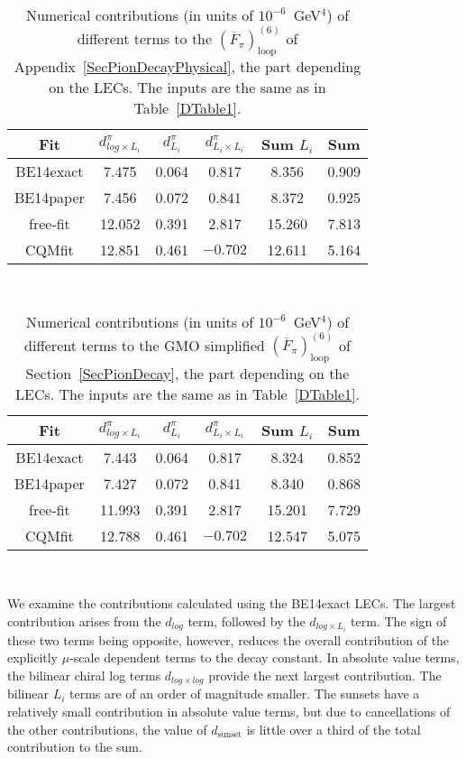\documentclass[12pt,a4paper]{article}
\begin{document}
\begin{table}
\centering
\begin{tabular}{| c || c c c | c | c |}
\hline
Fit & $d^{\pi}_{log \times L_i}$ & $d^\pi_{L_i}$ & $ d^\pi_{L_i\times L_i}$ & Sum $L_i$ & Sum \\ 
\hline
\hline
BE14exact &  7.475 & 0.064 & 0.817 &  8.356 & 0.909 \\
BE14paper &  7.456 & 0.072 & 0.841 &  8.372 & 0.925 \\
free-fit  & 12.052 & 0.391 & 2.817 & 15.260 & 7.813 \\
CQMfit    & 12.851 & 0.461 & $-0.702$ & 12.611 & 5.164 \\ [1ex]
\hline
\end{tabular} \\
\caption{Numerical contributions (in units of $10^{-6}$~GeV$^{4}$) of different terms to the $\left( \overline{F}_{\pi} \right)^{(6)}_{\text{loop}}$ of Appendix~\ref{SecPionDecayPhysical}, the part depending on the LECs. The inputs are the same as in Table~\ref{DTable1}.}
\label{DTable}
\end{table}

\begin{table}
\centering
\begin{tabular}{| c || c c c | c | c |}
\hline
Fit & $d^{\pi}_{log \times L_i}$ & $d^\pi_{L_i}$ & $ d^\pi_{L_i\times L_i}$ & Sum $L_i$ & Sum \\ 
\hline
\hline
BE14exact &  7.443 & 0.064 &   0.817 &  8.324 & 0.852 \\
BE14paper &  7.427 & 0.072 &   0.841 &  8.340 & 0.868 \\
free-fit  & 11.993 & 0.391 &   2.817 & 15.201 & 7.729 \\
CQMfit    & 12.788 & 0.461 & $-0.702$ & 12.547 & 5.075 \\ [1ex]
\hline
\end{tabular} \\
\caption{Numerical contributions (in units of $10^{-6}$~GeV$^{4}$) of different terms to the GMO simplified $\left( \overline{F}_{\pi} \right)^{(6)}_{\text{loop}}$ of Section~\ref{SecPionDecay}, the part depending on the LECs. The inputs are the same as in Table~\ref{DTable1}.}
\label{DTable2}
\end{table}

We examine the contributions calculated using the BE14exact LECs. The largest contribution arises from the $d_{log}$ term, followed by the $d_{log \times L_i}$ term. The sign of these two terms being opposite, however, reduces the overall contribution of the explicitly $\mu$-scale dependent terms to the decay constant. In absolute value terms, the bilinear chiral log terms $d_{log \times log}$ provide the next largest contribution. The bilinear $L_i$ terms are of an order of magnitude smaller. The sunsets have a relatively small contribution in absolute value terms, but due to cancellations of the other contributions, the value of $d_{\text{sunset}}$ is little over a third of the total contribution to the sum.
\end{document}

